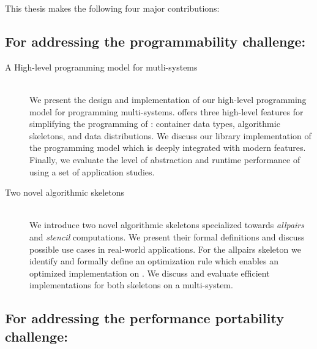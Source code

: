 This thesis makes the following four major contributions:

\subsection*{\hspace{2em}For addressing the programmability challenge:}

\begin{description}
  \item[A High-level programming model for mutli-\GPU systems]\hfill\\[-1em]
    We present the design and implementation of our high-level programming model \SkelCL for programming multi-\GPU systems.
    \SkelCL offers three high-level features for simplifying the programming of \GPUs: container data types, algorithmic skeletons, and data distributions.
    We discuss our \Cpp library implementation of the \SkelCL programming model which is deeply integrated with modern \Cpp features.
    Finally, we evaluate the level of abstraction and runtime performance of \SkelCL using a set of application studies.

  \item[Two novel algorithmic skeletons]\hfill\\[.25em]
    We introduce two novel algorithmic skeletons specialized towards \emph{allpairs} and \emph{stencil} computations.
    We present their formal definitions and discuss possible use cases in real-world applications.
    For the allpairs skeleton we identify and formally define an optimization rule which enables an optimized implementation on \GPUs.
    We discuss and evaluate efficient implementations for both skeletons on a multi-\GPU system.
\end{description}

\subsection*{\hspace{2em}For addressing the performance portability challenge:}

